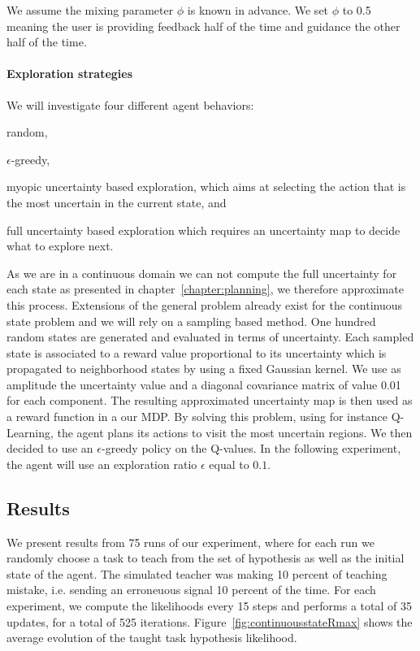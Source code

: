 We assume the mixing parameter $\phi$ is known in advance. We set $\phi$ to 0.5 meaning the user is providing feedback half of the time and guidance the other half of the time. 

\paragraph{Exploration strategies}

We will investigate four different agent behaviors: \begin{inparaenum}[a)] \item random, \item $\epsilon$-greedy, \item myopic uncertainty based exploration, which aims at selecting the action that is the most uncertain in the current state, and \item full uncertainty based exploration which requires an uncertainty map to decide what to explore next. \end{inparaenum} 

As we are in a continuous domain we can not compute the full uncertainty for each state as presented in chapter~\ref{chapter:planning}, we therefore approximate this process. Extensions of the general problem already exist for the continuous state problem \cite{nouri2010dimension,Hester13aamas} and we will rely on a sampling based method. One hundred random states are generated and evaluated in terms of uncertainty. Each sampled state is associated to a reward value proportional to its uncertainty which is propagated to neighborhood states by using a fixed Gaussian kernel. We use as amplitude the uncertainty value and a diagonal covariance matrix of value 0.01 for each component. The resulting approximated uncertainty map is then used as a reward function in a our MDP. By solving this problem, using for instance Q-Learning, the agent plans its actions to visit the most uncertain regions. We then decided to use an $\epsilon$-greedy policy on the Q-values. In the following experiment, the agent will use an exploration ratio $\epsilon$ equal to $0.1$.

\subsection{Results}

We present results from 75 runs of our experiment, where for each run we randomly choose a task to teach from the set of hypothesis as well as the initial state of the agent. The simulated teacher was making 10 percent of teaching mistake, i.e. sending an erroneuous signal 10 percent of the time. For each experiment, we compute the likelihoods every 15 steps and performs a total of 35 updates, for a total of 525 iterations. Figure~\ref{fig:continuousstateRmax} shows the average evolution of the taught task hypothesis likelihood.

